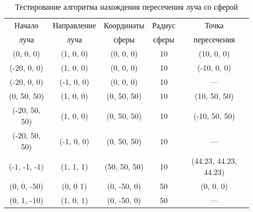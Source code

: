 \begin{table}[h]
	\begin{center}
		\begin{threeparttable}
			\captionsetup{justification=raggedright,singlelinecheck=off}
			\caption{Тестирование алгоритма нахождения пересечения луча со сферой}
			\label{tbl:test_sph_hit}
			\begin{tabular}{|c|c|c|c|c|}
				\hline
				Начало  & Направление  & Координаты  & Радиус & Точка \\
				 луча &  луча &  сферы & сферы & пересечения \\
				\hline
				(0, 0, 0) & (1, 0, 0) & (0, 0, 0) & 10 & (10, 0, 0) \\
				\hline
				(-20, 0, 0) & (1, 0, 0) & (0, 0, 0) & 10 & (-10, 0, 0) \\
				\hline
				(-20, 0, 0) & (-1, 0, 0) & (0, 0, 0) & 10 & --- \\
				\hline
				 (0, 50, 50) & (1, 0, 0) & (0, 50, 50) & 10 & (10, 50, 50) \\
				\hline
				(-20, 50, 50) & (1, 0, 0) & (0, 50, 50) & 10 & (-10, 50, 50) \\
				\hline
				(-20, 50, 50) & (-1, 0, 0) & (0, 50, 50) & 10 & --- \\
				\hline
				(-1, -1, -1) & (1, 1, 1) & (50, 50, 50) & 10 & (44.23, 44.23, 44.23) \\
				\hline
				(0, 0, -50) & (0, 0 1) & (0, -50, 0) & 50 & (0, 0, 0) \\
				\hline
				(0, 1, -10) & (1, 0, 1) & (0, -50, 0) & 50 & --- \\
				\hline
			\end{tabular}
		\end{threeparttable}
	\end{center}
\end{table}

